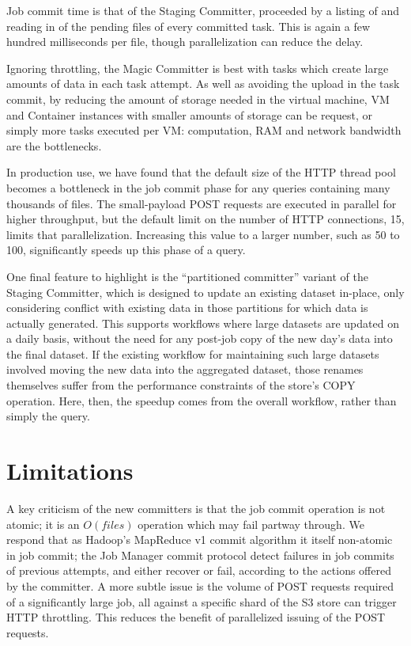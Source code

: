 \documentclass[conference]{IEEEtran}
\begin{document}
Job commit time is that of the Staging Committer, proceeded by a listing
of and reading in of the pending files of every committed task.
This is again a few hundred milliseconds per file, though parallelization
can reduce the delay.

Ignoring throttling, the Magic Committer is best with tasks which create
large amounts of data in each task attempt.
As well as avoiding the upload in the task commit, by reducing the
amount of storage needed in the virtual machine, VM and Container instances
with smaller amounts of storage can be request, or simply more tasks executed
per VM: computation, RAM and network bandwidth are the bottlenecks.

In production use, we have found that the default size of the HTTP thread
pool becomes a bottleneck in the job commit phase for any queries
containing many thousands of files.
The small-payload POST requests are executed in parallel for higher
throughput, but the default limit on the number of HTTP connections, 15, 
limits that parallelization.
Increasing this value to a larger number, such as 50 to 100, significantly
speeds up this phase of a query.

One final feature to highlight is the ``partitioned committer'' variant
of the Staging Committer, which is designed to update an existing
dataset in-place, only considering conflict with existing data in
those partitions for which data is actually generated.
This supports workflows where large datasets are updated on a daily basis,
without the need for any post-job copy of the new day's data into the
final dataset.
If the existing workflow for maintaining such large datasets involved
moving the new data into the aggregated dataset, those renames themselves
suffer from the performance constraints of the store's COPY operation.
Here, then, the speedup comes from the overall workflow, rather than
simply the query.



\section{Limitations}
\label{sec:limitations}

A key criticism of the new committers is that the job commit operation is not atomic;
it is an $O(files)$ operation which may fail partway through.
We respond that as Hadoop's MapReduce v1 commit algorithm it itself non-atomic in job commit;
the Job Manager commit protocol detect failures in job commits
of previous attempts, and either recover or fail, according to the actions
offered by the committer.
A more subtle issue is the volume of POST requests required of a significantly large job,
all against a specific shard of the S3 store can trigger HTTP throttling.
This reduces the benefit of parallelized issuing of the POST requests.
\end{document}
